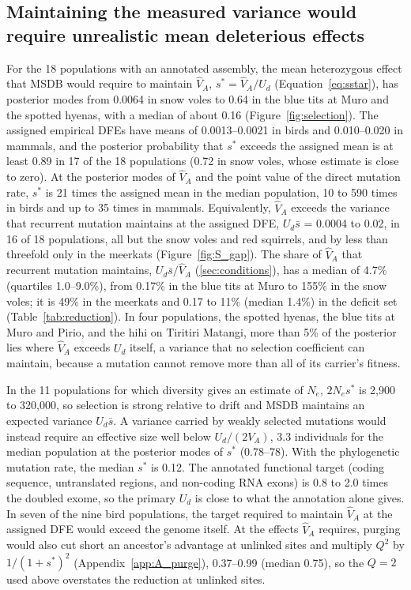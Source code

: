\documentclass{article}
\begin{document}
\subsection{Maintaining the measured variance would require unrealistic mean deleterious effects}\label{sec:res_msd}
For the 18 populations with an annotated assembly, the mean heterozygous effect that MSDB would require to maintain $\hat{V}_A$, $s^* = \hat{V}_A/U_d$ (Equation~\eqref{eq:sstar}), has posterior modes from 0.0064 in snow voles to 0.64 in the blue tits at Muro and the spotted hyenas, with a median of about 0.16 (Figure~\ref{fig:selection}). The assigned empirical DFEs have means of 0.0013--0.0021 in birds and 0.010--0.020 in mammals, and the posterior probability that $s^*$ exceeds the assigned mean is at least 0.89 in 17 of the 18 populations (0.72 in snow voles, whose estimate is close to zero). At the posterior modes of $\hat{V}_A$ and the point value of the direct mutation rate, $s^*$ is 21 times the assigned mean in the median population, 10 to 590 times in birds and up to 35 times in mammals. Equivalently, $\hat{V}_A$ exceeds the variance that recurrent mutation maintains at the assigned DFE, $U_d\bar{s}$ = 0.0004 to 0.02, in 16 of 18 populations, all but the snow voles and red squirrels, and by less than threefold only in the meerkats (Figure~\ref{fig:S_gap}). The share of $\hat{V}_A$ that recurrent mutation maintains, $U_d\bar{s}/\hat{V}_A$ (\autoref{sec:conditions}), has a median of 4.7\% (quartiles 1.0--9.0\%), from 0.17\% in the blue tits at Muro to 155\% in the snow voles; it is 49\% in the meerkats and 0.17 to 11\% (median 1.4\%) in the deficit set (Table~\ref{tab:reduction}). In four populations, the spotted hyenas, the blue tits at Muro and Pirio, and the hihi on Tiritiri Matangi, more than 5\% of the posterior lies where $\hat{V}_A$ exceeds $U_d$ itself, a variance that no selection coefficient can maintain, because a mutation cannot remove more than all of its carrier's fitness.

In the 11 populations for which diversity gives an estimate of $N_e$, $2N_es^*$ is 2,900 to 320,000, so selection is strong relative to drift and MSDB maintains an expected variance $U_d\bar{s}$. A variance carried by weakly selected mutations would instead require an effective size well below $U_d/(2V_A)$, 3.3 individuals for the median population at the posterior modes of $s^*$ (0.78--78). With the phylogenetic mutation rate, the median $s^*$ is 0.12. The annotated functional target (coding sequence, untranslated regions, and non-coding RNA exons) is 0.8 to 2.0 times the doubled exome, so the primary $U_d$ is close to what the annotation alone gives. In seven of the nine bird populations, the target required to maintain $\hat{V}_A$ at the assigned DFE would exceed the genome itself. At the effects $\hat{V}_A$ requires, purging would also cut short an ancestor's advantage at unlinked sites and multiply $Q^2$ by $1/(1 + s^*)^2$ (Appendix~\ref{app:A_purge}), 0.37--0.99 (median 0.75), so the $Q = 2$ used above overstates the reduction at unlinked sites.
\end{document}
